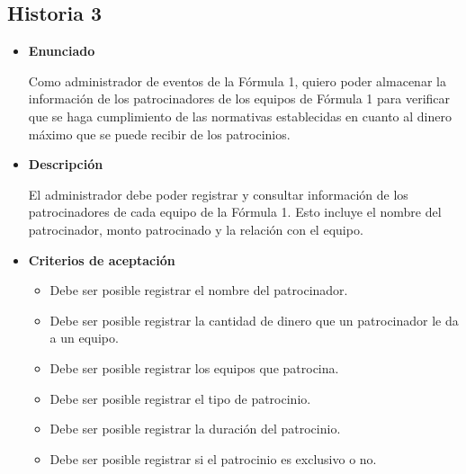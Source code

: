 \documentclass{article}
\begin{document}
	\subsection{Historia 3}
	\begin{itemize}
		
		\item \large{\textbf{Enunciado}}
		\begin{description}
			Como administrador de eventos de la Fórmula 1, quiero poder almacenar la información de los patrocinadores de los equipos de Fórmula 1 para verificar que se haga cumplimiento de las normativas establecidas en cuanto al dinero máximo que se puede recibir de los patrocinios.
			
		\end{description}
		
		\item \large{\textbf{Descripción}}
		\begin{description}
			El administrador debe poder registrar y consultar información de los patrocinadores de cada equipo de la Fórmula 1. Esto incluye el nombre del patrocinador, monto patrocinado y la relación con el equipo.

		\end{description}
		
		\item \large{\textbf{Criterios de aceptación}}
		\begin{itemize}
			\item Debe ser posible registrar el nombre del patrocinador.
			
			\item Debe ser posible registrar la cantidad de dinero que un patrocinador le da a un equipo.
			
			\item Debe ser posible registrar los equipos que patrocina.
			
			\item Debe ser posible registrar el tipo de patrocinio.
			
			\item Debe ser posible registrar la duración del patrocinio.
			
			\item Debe ser posible registrar si el patrocinio es exclusivo o no.
			
		\end{itemize}
		
	\end{itemize}
	
\end{document}
